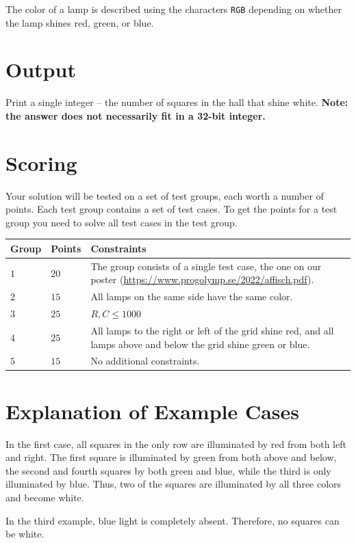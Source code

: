 The color of a lamp is described using the characters \texttt{RGB} depending on whether the lamp shines red, green, or blue.

\section*{Output}
Print a single integer -- the number of squares in the hall that shine white.
\textbf{Note: the answer does not necessarily fit in a 32-bit integer.}

\section*{Scoring}
Your solution will be tested on a set of test groups, each worth a number of points. Each test group contains
a set of test cases. To get the points for a test group you need to solve all test cases in the test group.

\noindent
\begin{tabular}{| l | l | p{12cm} |}
  \hline
  \textbf{Group} & \textbf{Points} & \textbf{Constraints} \\ \hline
  $1$    & $20$        &  The group consists of a single test case, the one on our poster (\url{https://www.progolymp.se/2022/affisch.pdf}). \\ \hline 
  $2$    & $15$        &  All lamps on the same side have the same color. \\ \hline
  $3$    & $25$        &  $R,C \le 1000$ \\ \hline 
  $4$    & $25$        &  All lamps to the right or left of the grid shine red, and all lamps above and below the grid shine green or blue. \\ \hline
  $5$    & $15$        &  No additional constraints. \\ \hline
\end{tabular}

\section*{Explanation of Example Cases}
In the first case, all squares in the only row are illuminated by red from both left and right.
The first square is illuminated by green from both above and below, the second and fourth squares by both green and blue, while the third is only illuminated by blue.
Thus, two of the squares are illuminated by all three colors and become white.

In the third example, blue light is completely absent.
Therefore, no squares can be white.
